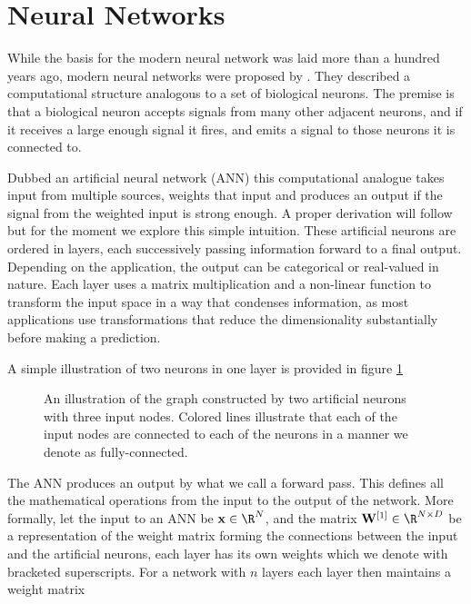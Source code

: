 
\section{Neural Networks}\label{sec:ANN}

While the basis for the modern neural network was laid more than a hundred years ago, modern neural networks were proposed by \citet{McCulloch1943}. They described a computational structure analogous to a set of biological neurons. The premise is that a biological neuron accepts signals from many other adjacent neurons, and if it receives a large enough signal it fires, and emits a signal to those neurons it is connected to.  

Dubbed an artificial neural network (ANN) this computational analogue takes input from multiple sources, weights that input and produces an output if the signal from the weighted input is strong enough. A proper derivation will follow but for the moment we explore this simple intuition. These artificial neurons are ordered in layers, each successively passing information forward to a final output. Depending on the application, the output can be categorical or real-valued in nature. Each layer uses a matrix multiplication and a non-linear function to transform the input space in a way that condenses information, as most applications use transformations that reduce the dimensionality substantially before making a prediction.

A simple illustration of two neurons in one layer is provided in figure \ref{fig:ann_illustration} 



\begin{figure}[h]
\centering

\caption[Fully connected neural network illustration]{An illustration of the graph constructed by two artificial neurons with three input nodes. Colored lines illustrate that  each of the input nodes are connected to each of the neurons in a manner we denote as fully-connected.}\label{fig:ann_illustration}
\end{figure}


\noindent The ANN produces an output by what we call a forward pass. This defines all the mathematical operations from the input to the output of the network. More formally, let the input to an ANN be $\mathbf{x} \in \R^N$, and the matrix $\mathbf{W}^{[1]} \in \R^{N \times D}$ be a representation of the weight matrix forming the connections between the input and the artificial neurons, each layer has its own weights which we denote with bracketed superscripts. For a network with $n$ layers each layer then maintains a weight matrix 

